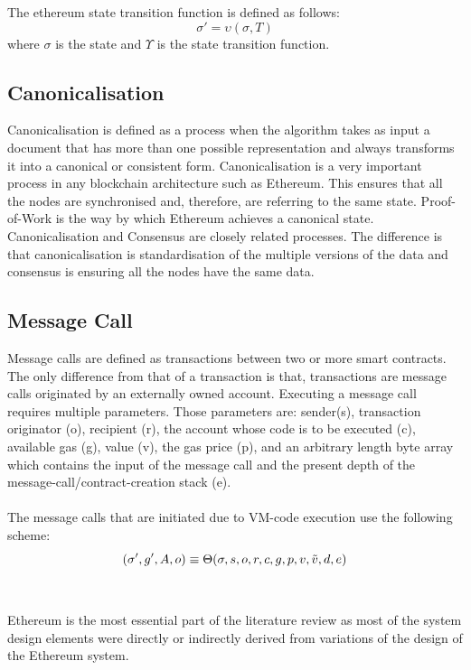 \documentclass[a4paper,twoside,phd]{BYUPhys}
\begin{document}
The ethereum state transition function is defined as follows\cite{Wood2018ETHEREUM:LEDGER}: \[\sigma' = \upsilon(\sigma, T)\]
where $\sigma$ is the state and $\Upsilon$ is the state transition function.

\subsection{Canonicalisation}
Canonicalisation is defined as a process when the algorithm takes as input a document that has more than one possible representation and always transforms it into a canonical or consistent form\cite{2017Merkle2017}. Canonicalisation is a very important process in any blockchain architecture such as Ethereum. This ensures that all the nodes are synchronised and, therefore, are referring to the same state\cite{2017Merkle2017}. Proof-of-Work is the way by which Ethereum achieves a canonical state\cite{GavinWood2018POLKADOT:FRAMEWORK}. Canonicalisation and Consensus are closely related processes. The difference is that canonicalisation is standardisation of the multiple versions of the data and consensus is ensuring all the nodes have the same data.
\subsection{Message Call}
Message calls are defined as transactions between two or more smart contracts\cite{ButerinAPLATFORM}. The only difference from that of a transaction is that, transactions are message calls originated by an externally owned account\cite{Wood2018ETHEREUM:LEDGER}. Executing a message call requires multiple parameters. Those parameters are: sender(s), transaction originator (o), recipient (r), the account whose code is to be executed (c), available gas (g), value (v), the gas price (p), and an arbitrary length byte array which contains the input of the message call and the present depth of the message-call/contract-creation stack (e)\cite{Wood2018ETHEREUM:LEDGER}.
\\ 
\\ 
The message calls that are initiated due to VM-code execution use the following scheme\cite{Wood2018ETHEREUM:LEDGER}:
\[(\sigma', g', A, o)\equiv \Theta(\sigma, s, o, r, c, g, p, v, \Tilde{v}, d, e)\]
\\
\\
Ethereum is the most essential part of the literature review as most of the system design elements were directly or indirectly derived from variations of the design of the Ethereum system. 
\end{document}
